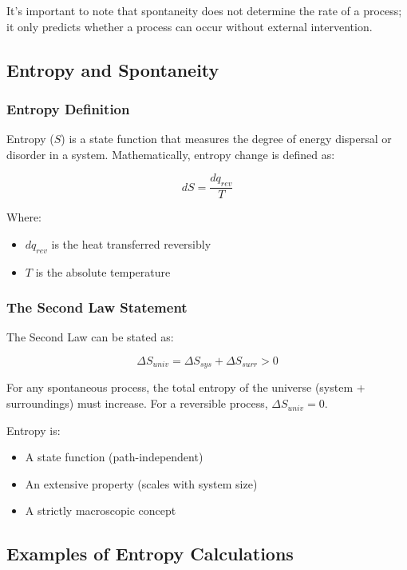 \documentclass{article}
\theoremstyle{definition}
\begin{document}
It's important to note that spontaneity does not determine the rate of a process; it only predicts whether a process can occur without external intervention.

\subsection{Entropy and Spontaneity}

\subsubsection{Entropy Definition}

Entropy ($S$) is a state function that measures the degree of energy dispersal or disorder in a system. Mathematically, entropy change is defined as:

\begin{equation}
dS = \frac{dq_{rev}}{T}
\end{equation}

Where:
\begin{itemize}
    \item $dq_{rev}$ is the heat transferred reversibly
    \item $T$ is the absolute temperature
\end{itemize}

\subsubsection{The Second Law Statement}

The Second Law can be stated as:

\begin{equation}
\Delta S_{univ} = \Delta S_{sys} + \Delta S_{surr} > 0
\end{equation}

For any spontaneous process, the total entropy of the universe (system + surroundings) must increase. For a reversible process, $\Delta S_{univ} = 0$.

Entropy is:
\begin{itemize}
    \item A state function (path-independent)
    \item An extensive property (scales with system size)
    \item A strictly macroscopic concept
\end{itemize}

\subsection{Examples of Entropy Calculations}
\end{document}
